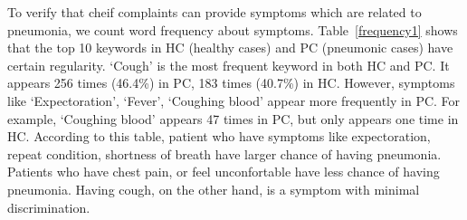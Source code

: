 \documentclass[journal]{IEEEtran}
\begin{document}
To verify that cheif complaints can provide symptoms which are related to pneumonia, we count word frequency about symptoms. Table~\ref{frequency1} shows that the top 10 keywords in HC (healthy cases) and PC (pneumonic cases) have certain regularity. `Cough' is the most frequent keyword in both HC and PC. It appears 256 times (46.4\%) in PC, 183 times (40.7\%) in HC. However, symptoms like `Expectoration', `Fever', `Coughing blood' appear more frequently in PC. For example, `Coughing blood' appears 47 times in PC, but only appears one time in HC. According to this table, patient who have symptoms like expectoration, repeat condition, shortness of breath have larger chance of having pneumonia. Patients who have chest pain, or feel unconfortable have less chance of having pneumonia. Having cough, on the other hand, is a symptom with minimal discrimination.
\end{document}

